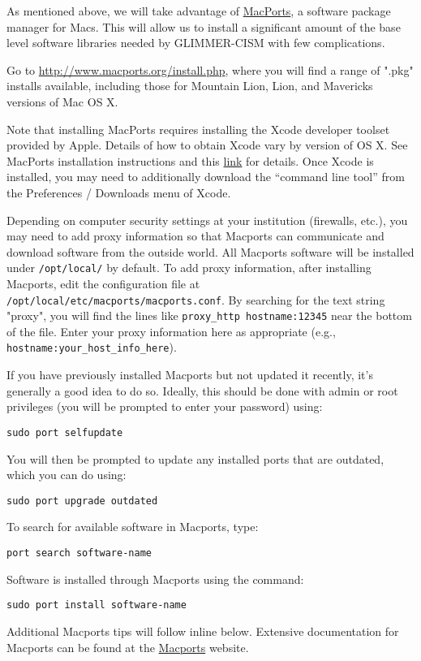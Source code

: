 \begin{mdframed}[style=mac] %
As mentioned above, we will take advantage of \href{http://www.macports.org/}{MacPorts}, 
a software package manager for Macs. This will allow us to install a significant amount 
of the base level software libraries needed by GLIMMER-CISM with few complications. 

Go to \href{http://www.macports.org/install.php}{http://www.macports.org/install.php}, where you will find a range of ".pkg" installs available, including those for Mountain Lion, Lion, and Mavericks versions of Mac OS X. 

Note that installing MacPorts requires installing the Xcode developer toolset provided by Apple. Details of how to obtain Xcode vary by version of OS X. See MacPorts installation instructions and this \href{https://developer.apple.com/xcode/downloads/}{link} for details. Once Xcode is installed, you may need to additionally download the ``command line tool'' from the Preferences / Downloads menu of Xcode. 

Depending on computer security settings at your institution (firewalls, etc.), you may need to add proxy information so that Macports can communicate and download software from the outside world. All Macports software will be installed under \texttt{/opt/local/} by default. To add proxy information, after installing Macports, edit the configuration file at \texttt{/opt/local/etc/macports/macports.conf}. By searching for the text string "proxy", you will find the lines like \texttt{proxy\_http hostname:12345} near the bottom of the file. Enter your proxy information here as appropriate (e.g., \texttt{hostname:your\_host\_info\_here}).

If you have previously installed Macports but not updated it recently, it's generally a good idea to do so. Ideally, this should be done with admin or root privileges (you will be prompted to enter your password) using:

\texttt{sudo port selfupdate}

You will then be prompted to update any installed ports that are outdated, which you can do using:

\texttt{sudo port upgrade outdated}

To search for available software in Macports, type: 

\texttt{port search software-name}

Software is installed through Macports using the command:

\texttt{sudo port install software-name}

Additional Macports tips will follow inline below. Extensive documentation for Macports 
can be found at the \href{http://guide.macports.org}{Macports} website.
\end{mdframed}              %


